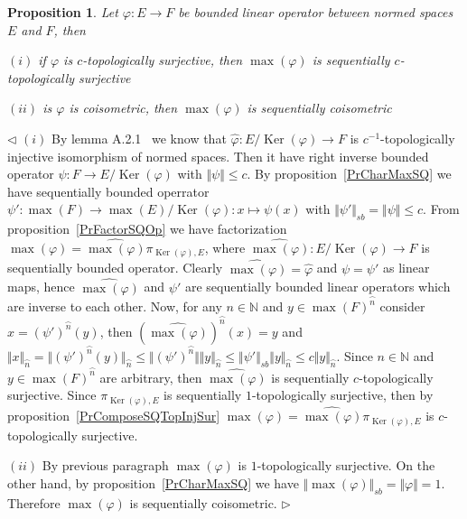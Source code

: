 \documentclass[12pt]{article}
\newtheorem{proposition}[theorem]{Proposition}
\newenvironment{proof}{\par $\triangleleft$}{$\triangleright$}
\begin{document}
\begin{proposition}\label{PrMaxPreserveQuotients} Let $\varphi:E\to F$ be 
bounded linear operator between normed spaces $E$ and $F$, then

$(i)$ if $\varphi$ is $c$-topologically surjective, then $\max(\varphi)$ 
is sequentially $c$-topologically surjective

$(ii)$ is $\varphi$ is coisometric, then $\max(\varphi)$ 
is sequentially coisometric
\end{proposition}
\begin{proof} $(i)$ By lemma A.2.1~\cite{EROpSp} we know that 
$\widehat{\varphi}:E/\operatorname{Ker}(\varphi)\to F$ 
is $c^{-1}$-topologically injective isomorphism of normed spaces. 
Then it have right inverse 
bounded operator $\psi:F\to E/\operatorname{Ker}(\varphi)$ 
with $\Vert\psi\Vert\leq c$. By proposition~\ref{PrCharMaxSQ} we have 
sequentially bounded operrator 
$\psi'
:\max(F)\to\max(E)/\operatorname{Ker}(\varphi)
:x\mapsto \psi(x)$ 
with $\Vert\psi'\Vert_{sb}=\Vert\psi\Vert\leq c$. 
From proposition~\ref{PrFactorSQOp} we have factorization 
$\max(\varphi)=\widehat{\max(\varphi)}\pi_{\operatorname{Ker}(\varphi),E}$, 
where $\widehat{\max(\varphi)}:E/\operatorname{Ker}(\varphi)\to F$ is 
sequentially bounded operator. Clearly 
$\widehat{\max(\varphi)}=\widehat{\varphi}$ and $\psi=\psi'$ as linear maps, 
hence $\widehat{\max(\varphi)}$ and $\psi'$ are sequentially bounded linear 
operators which are inverse to each other. Now, for any $n\in\mathbb{N}$  
and $y\in{\max(F)}^{\wideparen{n}}$ consider $x={(\psi')}^{\wideparen{n}}(y)$, 
then ${(\widehat{\max(\varphi)})}^{\wideparen{n}}(x)=y$ 
and $\Vert x\Vert_{\wideparen{n}}
=\Vert{(\psi')}^{\wideparen{n}}(y)\Vert_{\wideparen{n}}
\leq\Vert{(\psi')}^{\wideparen{n}}\Vert\Vert y\Vert_{\wideparen{n}}
\leq\Vert \psi'\Vert_{sb}\Vert y\Vert_{\wideparen{n}}
\leq c\Vert y\Vert_{\wideparen{n}}$. Since $n\in\mathbb{N}$ 
and $y\in {\max(F)}^{\wideparen{n}}$ are arbitrary, 
then $\widehat{\max(\varphi)}$ is sequentially $c$-topologically surjective. 
Since $\pi_{\operatorname{Ker}(\varphi),E}$ is sequentially $1$-topologically 
surjective, then by proposition~\ref{PrComposeSQTopInjSur} 
$\max(\varphi)=\widehat{\max(\varphi)}\pi_{\operatorname{Ker}(\varphi),E}$ 
is $c$-topologically surjective.

$(ii)$ By previous paragraph $\max(\varphi)$ is $1$-topologically surjective. On 
the other hand, by proposition~\ref{PrCharMaxSQ} we have 
$\Vert\max(\varphi)\Vert_{sb}=\Vert\varphi\Vert=1$. 
Therefore $\max(\varphi)$ is sequentially coisometric.
\end{proof}
\end{document}
